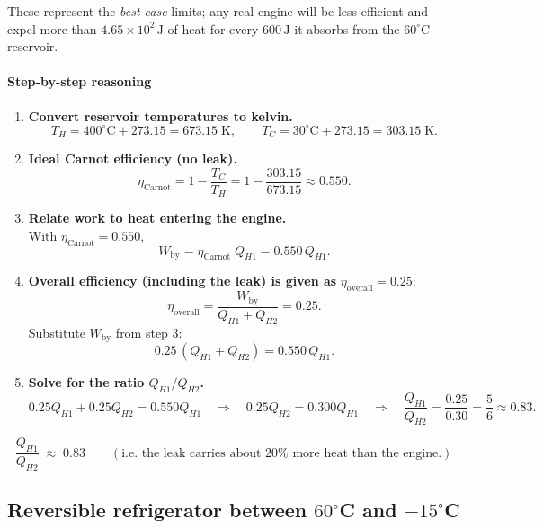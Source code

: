\documentclass[12pt]{article}
\theoremstyle{definition} %
\theoremstyle{plain} %
\begin{document}
\medskip
\noindent
These represent the \emph{best-case} limits; any real engine will be less efficient and expel more than \(4.65\times10^{2}\,\text{J}\) of heat for every \(600\,\text{J}\) it absorbs from the \(60^{\circ}\text{C}\) reservoir.
\paragraph{Step-by-step reasoning}

\begin{enumerate}
  \item \textbf{Convert reservoir temperatures to kelvin.}
        \[
          T_H = 400^{\circ}\text{C}+273.15 = 673.15\;\text{K},
          \qquad
          T_C =  30^{\circ}\text{C}+273.15 = 303.15\;\text{K}.
        \]

  \item \textbf{Ideal Carnot efficiency (no leak).}
        \[
          \eta_{\text{Carnot}}
          = 1 - \frac{T_C}{T_H}
          = 1 - \frac{303.15}{673.15}
          \approx 0.550.
        \]

  \item \textbf{Relate work to heat entering the engine.}\\
        With \(\eta_{\text{Carnot}}=0.550\),
        \[
          W_{\text{by}} = \eta_{\text{Carnot}}\;Q_{H1}
                        = 0.550\,Q_{H1}.
        \]

  \item \textbf{Overall efficiency (including the leak) is given as}
        \(\eta_{\text{overall}} = 0.25\):
        \[
          \eta_{\text{overall}}
          = \frac{W_{\text{by}}}{Q_{H1}+Q_{H2}}
          = 0.25.
        \]
        Substitute \(W_{\text{by}}\) from step 3:
        \[
          0.25\,(Q_{H1}+Q_{H2}) = 0.550\,Q_{H1}.
        \]

  \item \textbf{Solve for the ratio \(Q_{H1}/Q_{H2}\).}
        \[
          0.25Q_{H1} + 0.25Q_{H2} = 0.550Q_{H1}
          \quad\Longrightarrow\quad
          0.25Q_{H2} = 0.300Q_{H1}
          \quad\Longrightarrow\quad
          \frac{Q_{H1}}{Q_{H2}} = \frac{0.25}{0.30}
          = \frac{5}{6}
          \approx 0.83.
        \]
\end{enumerate}

\[
  \boxed{\dfrac{Q_{H1}}{Q_{H2}} \;\approx\; 0.83} \qquad
  (\text{i.e.\ the leak carries about }20\%\text{ more heat than the engine.})
\]
\subsection*{Reversible refrigerator between $60^{\circ}$C and $-15^{\circ}$C}
\end{document}
